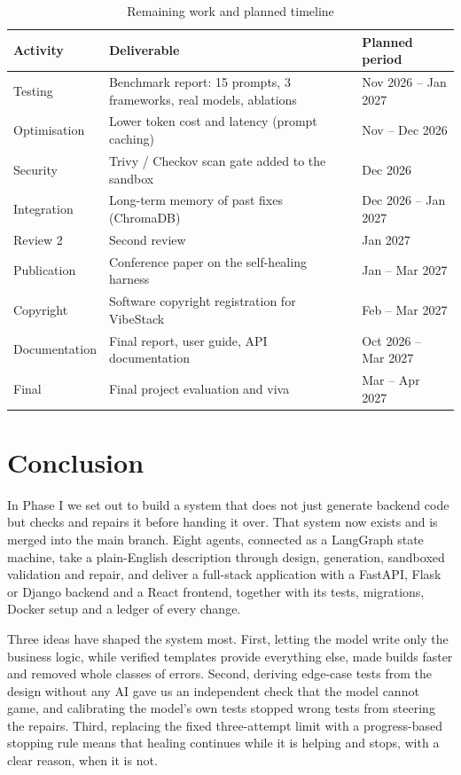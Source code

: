 \documentclass[12pt,a4paper]{report}
\begin{document}
\begin{table}[!ht]
    \centering
    \renewcommand{\arraystretch}{1.3}
    \caption{Remaining work and planned timeline}
    \label{tab:remaining}
    \begin{tabular}{|p{2.8cm}|p{7.2cm}|p{3.4cm}|}
    \hline
    \textbf{Activity} & \textbf{Deliverable} & \textbf{Planned period} \\\hline
    Testing & Benchmark report: 15 prompts, 3 frameworks, real models, ablations & Nov 2026 -- Jan 2027 \\\hline
    Optimisation & Lower token cost and latency (prompt caching) & Nov -- Dec 2026 \\\hline
    Security & Trivy / Checkov scan gate added to the sandbox & Dec 2026 \\\hline
    Integration & Long-term memory of past fixes (ChromaDB) & Dec 2026 -- Jan 2027 \\\hline
    Review 2 & Second review & Jan 2027 \\\hline
    Publication & Conference paper on the self-healing harness & Jan -- Mar 2027 \\\hline
    Copyright & Software copyright registration for VibeStack & Feb -- Mar 2027 \\\hline
    Documentation & Final report, user guide, API documentation & Oct 2026 -- Mar 2027 \\\hline
    Final & Final project evaluation and viva & Mar -- Apr 2027 \\\hline
    \end{tabular}
\end{table}

\chapter{Conclusion}

In Phase I we set out to build a system that does not just generate backend code but checks and repairs it before handing it over. That system now exists and is merged into the main branch. Eight agents, connected as a LangGraph state machine, take a plain-English description through design, generation, sandboxed validation and repair, and deliver a full-stack application with a FastAPI, Flask or Django backend and a React frontend, together with its tests, migrations, Docker setup and a ledger of every change.

Three ideas have shaped the system most. First, letting the model write only the business logic, while verified templates provide everything else, made builds faster and removed whole classes of errors. Second, deriving edge-case tests from the design without any AI gave us an independent check that the model cannot game, and calibrating the model's own tests stopped wrong tests from steering the repairs. Third, replacing the fixed three-attempt limit with a progress-based stopping rule means that healing continues while it is helping and stops, with a clear reason, when it is not.
\end{document}

